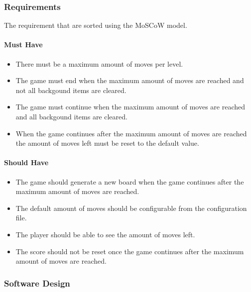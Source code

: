 \documentclass{article}
\begin{document}
\subsubsection{Requirements}
The requirement that are sorted using the MoSCoW model.

\paragraph{Must Have}
\begin{itemize}
	\item There must be a maximum amount of moves per level.
	\item The game must end when the maximum amount of moves are reached and not all backgound items are cleared.
	\item The game must continue when the maximum amount of moves are reached and all backgound items are cleared.
	\item When the game continues after the maximum amount of moves are reached the amount of moves left must be reset to the default value.
\end{itemize}
\paragraph{Should Have}
\begin{itemize}
	\item The game should generate a new board when the game continues after the maximum amount of moves are reached.
	\item The default amount of moves should be configurable from the configuration file.
	\item The player should be able to see the amount of moves left.
	\item The score should not be reset once the game continues after the maximum amount of moves are reached.
\end{itemize}


\subsubsection{Software Design}
\end{document}

